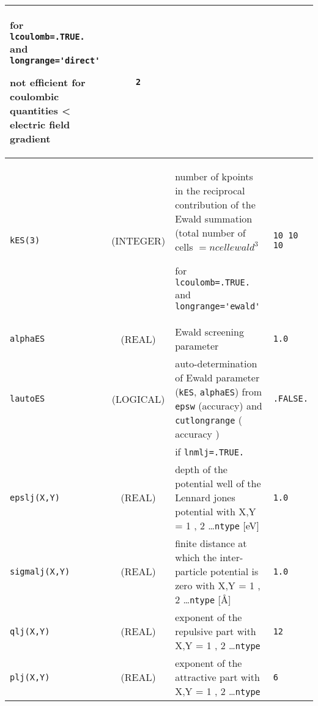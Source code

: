 \documentclass[a4paper]{article}
\begin{document}
\begin{longtable}{l|c|m{8cm}|m{2cm}}
                                          for \verb?lcoulomb=.TRUE.? and \verb?longrange='direct'?  \newline                  
					  
					  not efficient for coulombic quantities < electric field gradient                 & \verb?2? \\
\hline
\rule[-0.75cm]{0cm}{1.5cm}
\verb?kES(3)?    &  (INTEGER)         & \newline number of kpoints in the reciprocal contribution of the Ewald summation
                                         (total number of cells $=ncellewald^3$ \newline                                      
					 
					 for \verb?lcoulomb=.TRUE.? and \verb?longrange='ewald'?  \newline                  & \verb?10 10 10? \\
\hline
\rule[-0.75cm]{0cm}{1.5cm}
\verb?alphaES?   &  (REAL)            & Ewald screening parameter                                                           & \verb?1.0? \\
\hline
\rule[-0.75cm]{0cm}{1.5cm}
\verb?lautoES?   & (LOGICAL)          & auto-determination of Ewald parameter (\verb?kES?, \verb?alphaES?) 
                                        from \verb?epsw? (accuracy) and \verb?cutlongrange? ( accuracy )                    & \verb?.FALSE.? \\
\hline
\hline
\rule[-0.75cm]{0cm}{1.5cm}
                 &                    & if \verb?lnmlj=.TRUE.?                                                              & \\
\hline
\rule[-0.75cm]{0cm}{1.5cm}
\verb?epslj(X,Y)?& (REAL)             & depth of the potential well of the Lennard jones potential 
                                        with X,Y = 1 , 2 \ldots \verb?ntype? [eV]                                           & \verb?1.0? \tabularnewline
\hline
\rule[-0.75cm]{0cm}{1.5cm}
\verb?sigmalj(X,Y)?          
                 & (REAL)             & finite distance at which the inter-particle potential is zero with 
                                          X,Y = 1 , 2 \ldots \verb?ntype? [\AA]                                             & \verb?1.0? \\
\hline
\rule[-0.75cm]{0cm}{1.5cm}
\verb?qlj(X,Y)?  & (REAL)             & exponent of the repulsive part with X,Y = 1 , 2 \ldots \verb?ntype?                 & \verb?12? \\
\hline
\rule[-0.75cm]{0cm}{1.5cm}
\verb?plj(X,Y)?  & (REAL)             & exponent of the attractive part with X,Y = 1 , 2 \ldots \verb?ntype?                & \verb?6? \\

\end{longtable}
\end{document}
